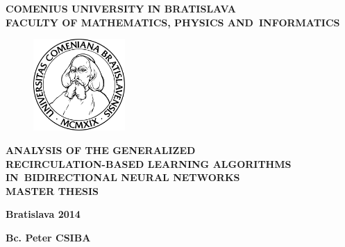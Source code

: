 \begin{center}
    \large{
        \textbf{
            COMENIUS UNIVERSITY IN BRATISLAVA \\ 
            FACULTY OF MATHEMATICS, PHYSICS AND~INFORMATICS
        }
    }
\end{center}

\vspace{2cm}

\begin{figure}[!h]
    \centering
    \includegraphics[width=3.5cm]{img/komlogo-new.pdf}
\end{figure}

\vspace{1cm}

\begin{center}
    \large{
        \textbf{
            ANALYSIS OF THE GENERALIZED \\
            RECIRCULATION-BASED LEARNING ALGORITHMS \\
            IN~BIDIRECTIONAL NEURAL NETWORKS \\
            \vspace{3cm}
            MASTER THESIS
        }
    }
\end{center}

\vfill

\begin{multicols}{2}
    \begin{flushleft}
        \textbf{Bratislava 2014}
    \end{flushleft}
    \begin{flushright}
        \textbf{Bc. Peter CSIBA}
    \end{flushright}
\end{multicols}

